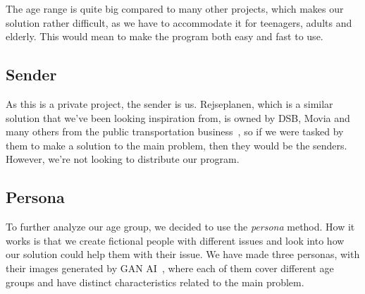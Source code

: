 The age range is quite big compared to many other projects, which makes our solution rather difficult, as we have to
accommodate it for teenagers, adults and elderly.
This would mean to make the program both easy and fast to use.

\subsection{Sender}\label{subsec:sender}

As this is a private project, the sender is us.
Rejseplanen, which is a similar solution that we've been looking inspiration from, is owned by DSB, Movia and many
others from the public transportation business~\cite{om_rejseplanen}, so if we were tasked by them to make a solution to
the main problem, then they would be the senders.
However, we're not looking to distribute our program.

\subsection{Persona}\label{subsec:persona}

To further analyze our age group, we decided to use the \textit{persona} method.
How it works is that we create fictional people with different issues and look into how our solution could help them
with their issue.
We have made three personas, with their images generated by GAN AI~\cite{thispersondoesnotexist}, where each of them cover
different age groups and have distinct characteristics related to the main problem.


\renewcommand{\arraystretch}{1.5}

